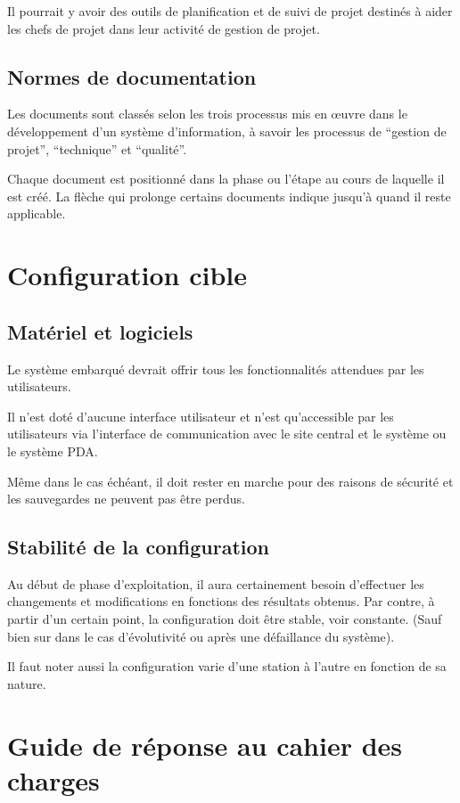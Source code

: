 	Il pourrait y avoir des outils de planification et de suivi de projet destinés à aider les chefs de projet dans leur activité de gestion de projet.

    \subsection{Normes de documentation}
Les documents sont classés selon les trois processus mis en œuvre dans 
le développement d'un système d'information, à savoir les processus de ``gestion de projet'', ``technique'' et ``qualité''.

Chaque document est positionné dans la phase ou l'étape au cours de laquelle il est créé. La flèche qui prolonge certains documents indique jusqu'à quand il reste applicable.
\section{Configuration cible}

    \subsection{Matériel et logiciels}

	Le système embarqué devrait offrir tous les fonctionnalités attendues par les utilisateurs. 
	
		Il n’est doté d’aucune interface utilisateur et n’est qu’accessible par les utilisateurs via l’interface de communication avec le site central et le système ou le système PDA.
		
		 Même dans le cas échéant, il doit rester en marche pour des raisons de sécurité et les sauvegardes ne peuvent pas être perdus. 
    
    \subsection{Stabilité de la configuration}
	    
	Au début de phase d’exploitation, il aura certainement besoin d’effectuer les changements et modifications en fonctions des résultats obtenus. Par contre, à partir d’un certain point, la configuration doit être stable, voir constante. (Sauf bien sur dans le cas d’évolutivité ou après une défaillance du système). 
	
	Il faut noter aussi la configuration varie d’une station à l’autre en fonction de sa nature. 

\section{Guide de réponse au cahier des charges}

